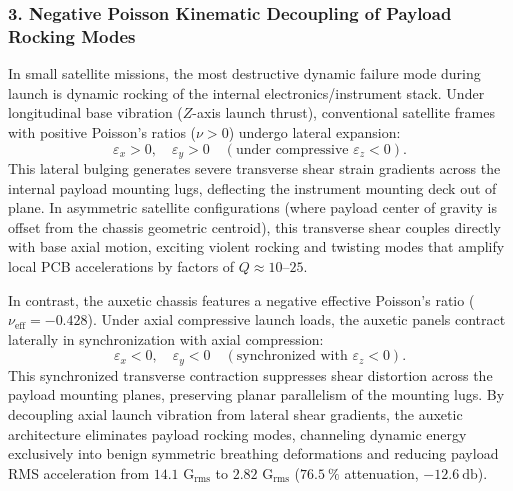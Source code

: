 \subsubsection{3. Negative Poisson Kinematic Decoupling of Payload Rocking Modes}
In small satellite missions, the most destructive dynamic failure mode during launch is dynamic rocking of the internal electronics/instrument stack. Under longitudinal base vibration ($Z$-axis launch thrust), conventional satellite frames with positive Poisson's ratios ($\nu > 0$) undergo lateral expansion:
\begin{equation}
\varepsilon_x > 0, \quad \varepsilon_y > 0 \quad (\text{under compressive } \varepsilon_z < 0).
\label{eq:positive_bulging}
\end{equation}
This lateral bulging generates severe transverse shear strain gradients across the internal payload mounting lugs, deflecting the instrument mounting deck out of plane. In asymmetric satellite configurations (where payload center of gravity is offset from the chassis geometric centroid), this transverse shear couples directly with base axial motion, exciting violent rocking and twisting modes that amplify local PCB accelerations by factors of $Q \approx 10\text{--}25$.

In contrast, the auxetic chassis features a negative effective Poisson's ratio ($\nu_{\text{eff}} = -0.428$). Under axial compressive launch loads, the auxetic panels contract laterally in synchronization with axial compression:
\begin{equation}
\varepsilon_x < 0, \quad \varepsilon_y < 0 \quad (\text{synchronized with } \varepsilon_z < 0).
\label{eq:negative_contraction}
\end{equation}
This synchronized transverse contraction suppresses shear distortion across the payload mounting planes, preserving planar parallelism of the mounting lugs. By decoupling axial launch vibration from lateral shear gradients, the auxetic architecture eliminates payload rocking modes, channeling dynamic energy exclusively into benign symmetric breathing deformations and reducing payload RMS acceleration from $14.1\text{ G}_{\text{rms}}$ to $2.82\text{ G}_{\text{rms}}$ ($\SI{76.5}{\percent}$ attenuation, $\SI{-12.6}{\decibel}$).

